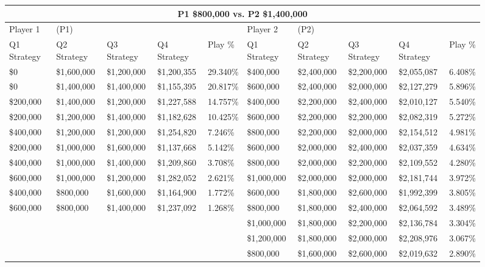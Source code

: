 \documentclass[11pt]{article}
\begin{document}
\begin{figure}
\tiny
\begin{tabular}{ |p{1.0cm}p{1.0cm}p{1.0cm}p{2.0cm}|p{1.0cm}||p{1.0cm}p{1.0cm}p{1.0cm}p{2.0cm}|p{1.0cm}|}
\hline
\multicolumn{10}{|c|}{P1 \$800,000 vs. P2 \$1,400,000} \\
\hline
Player 1 & (P1) & & & & Player 2 & (P2) & & & \\
\hline
Q1 Strategy & Q2 Strategy & Q3 Strategy & Q4 Strategy  &  Play \% & Q1 Strategy & Q2 Strategy & Q3 Strategy & Q4 Strategy  &  Play \%\\
\hline
\$0 & \$1,600,000 & \$1,200,000 & \$1,200,355 & 29.340\% & \$400,000 & \$2,400,000 & \$2,200,000 & \$2,055,087 & 6.408\% \\
\$0 & \$1,400,000 & \$1,400,000 & \$1,155,395 & 20.817\% & \$600,000 & \$2,400,000 & \$2,000,000 & \$2,127,279 & 5.896\% \\
\$200,000 & \$1,400,000 & \$1,200,000 & \$1,227,588 & 14.757\% & \$400,000 & \$2,200,000 & \$2,400,000 & \$2,010,127 & 5.540\% \\
\$200,000 & \$1,200,000 & \$1,400,000 & \$1,182,628 & 10.425\% & \$600,000 & \$2,200,000 & \$2,200,000 & \$2,082,319 & 5.272\% \\
\$400,000 & \$1,200,000 & \$1,200,000 & \$1,254,820 & 7.246\% & \$800,000 & \$2,200,000 & \$2,000,000 & \$2,154,512 & 4.981\% \\
\$200,000 & \$1,000,000 & \$1,600,000 & \$1,137,668 & 5.142\% & \$600,000 & \$2,000,000 & \$2,400,000 & \$2,037,359 & 4.634\% \\
\$400,000 & \$1,000,000 & \$1,400,000 & \$1,209,860 & 3.708\% & \$800,000 & \$2,000,000 & \$2,200,000 & \$2,109,552 & 4.280\% \\
\$600,000 & \$1,000,000 & \$1,200,000 & \$1,282,052 & 2.621\% & \$1,000,000 & \$2,000,000 & \$2,000,000 & \$2,181,744 & 3.972\% \\
\$400,000 & \$800,000 & \$1,600,000 & \$1,164,900 & 1.772\% & \$600,000 & \$1,800,000 & \$2,600,000 & \$1,992,399 & 3.805\% \\
\$600,000 & \$800,000 & \$1,400,000 & \$1,237,092 & 1.268\% & \$800,000 & \$1,800,000 & \$2,400,000 & \$2,064,592 & 3.489\% \\
&&&& & \$1,000,000 & \$1,800,000 & \$2,200,000 & \$2,136,784 & 3.304\% \\
&&&& & \$1,200,000 & \$1,800,000 & \$2,000,000 & \$2,208,976 & 3.067\% \\
&&&& & \$800,000 & \$1,600,000 & \$2,600,000 & \$2,019,632 & 2.890\% \\

\end{tabular}
\end{figure}
\end{document}

